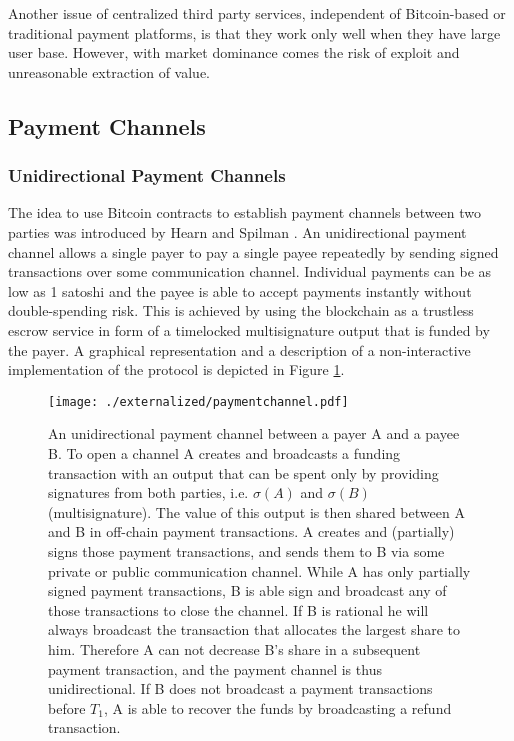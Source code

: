 Another issue of centralized third party services, independent of Bitcoin-based or traditional payment platforms, is that they work only well when they have large user base. However, with market dominance comes the risk of exploit and unreasonable extraction of value. 

\subsection{Payment Channels}

\subsubsection{Unidirectional Payment Channels}
\label{sec:unipc}

The idea to use Bitcoin contracts to establish payment channels between two parties was introduced by Hearn and Spilman \cite{Hearn}. An unidirectional payment channel allows a single payer to pay a single payee repeatedly by sending signed transactions over some communication channel. Individual payments can be as low as 1 satoshi and the payee is able to accept payments instantly without double-spending risk. This is achieved by using the blockchain as a trustless escrow service in form of a timelocked multisignature output that is funded by the payer. A graphical representation and a description of a non-interactive implementation of the protocol is depicted in Figure \ref{fig:paymentchannels}.

\begin{figure}
\texttt{[image: ./externalized/paymentchannel.pdf]}
\caption{An unidirectional payment channel between a payer A and a payee B. To open a channel A creates and broadcasts a funding transaction with an output that can be spent only by providing signatures from both parties, i.e. $\sigma(A)$ and $\sigma(B)$ (multisignature). The value of this output is then shared between A and B in off-chain payment transactions. A creates and (partially) signs those payment transactions, and sends them to B via some private or public communication channel. While A has only partially signed payment transactions, B is able sign and broadcast any of those transactions to close the channel. If B is rational he will always broadcast the transaction that allocates the largest share to him. Therefore A can not decrease B's share in a subsequent payment transaction, and the payment channel is thus unidirectional. If B does not broadcast a payment transactions before $T_1$, A is able to recover the funds by broadcasting a refund transaction.}
\label{fig:paymentchannels}
\end{figure}

